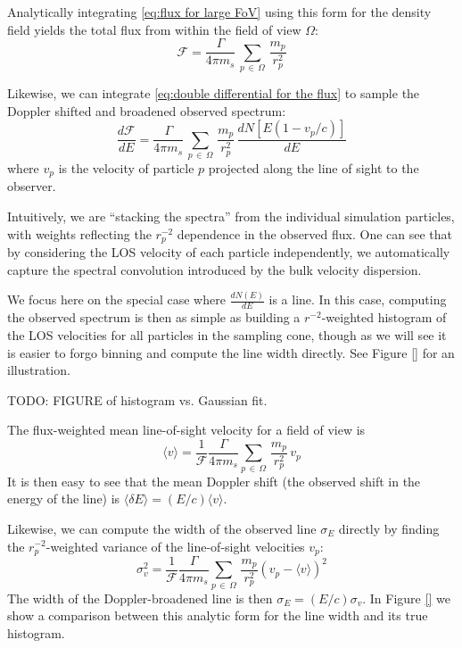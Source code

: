 \documentclass[aps,prl,10pt,twocolumn,superscriptaddress,showpacs]{revtex4-1}
\begin{document}
Analytically integrating \eqref{eq:flux for large FoV} using this form for the density field yields the
total flux from within the field of view $\Omega$:
\begin{equation} 
	\mathcal{F} = \frac{\Gamma}{4\pi m_s}
	\, \sum_{p \, \in \, \Omega} \, \frac{m_p}{r_p^{2}} 
\end{equation}

Likewise, we can integrate \eqref{eq:double differential for the flux} to sample the Doppler shifted
and broadened observed spectrum:
\begin{equation} \label{eq:discrete}
	\frac{d\mathcal{F}}{dE} = \frac{\Gamma}{4 \pi m_s}\, \sum_{p \, \in \, \Omega}
	\, \frac{m_p}{r_p^{2}} \, \frac{dN[E(1-v_p/c)]}{dE}
\end{equation}
where $v_p$ is the velocity of particle $p$ projected along the line of sight to the observer.

Intuitively, we are ``stacking the spectra'' from the individual simulation
particles, with weights reflecting the $r_p^{-2}$ dependence in the observed flux. One can see that by
considering the LOS velocity of each particle independently, we automatically capture the spectral
convolution introduced by the bulk velocity dispersion. 

We focus here on the special case where
$\frac{dN(E)}{dE}$ is a line. In this case, computing the observed spectrum is then as simple as
building a $r^{-2}$-weighted histogram of the LOS velocities for all particles in the sampling cone,
though as we will see it is easier to forgo binning and compute the line width directly. See Figure \ref{} for an
illustration.

TODO: FIGURE of histogram vs. Gaussian fit.

The flux-weighted mean line-of-sight velocity for a field of view is 
\begin{equation} 
	\langle v\rangle =\frac{1}{\mathcal{F}} \frac{\Gamma}{4\pi m_s} \sum_{p \, \in \, \Omega}
	\, \frac{m_p}{r_p^{2}} \, v_p
\end{equation}
It is then easy to see that the mean Doppler shift (the observed shift in the energy of the line) is  
	$\langle \delta E\rangle = (E/c)\langle v \rangle$.

Likewise, we can compute the width of the observed line $\sigma_E$ directly by finding the $r_p^{-2}$-weighted
variance of the line-of-sight velocities $v_p$:
\begin{equation} 
	\sigma_v^2 =\frac{1}{\mathcal{F}} \frac{\Gamma}{4\pi m_s} \sum_{p \, \in \, \Omega}
	\, \frac{m_p}{r_p^{2}} \left(v_p-\langle v\rangle\right)^2 
\end{equation}
The width of the Doppler-broadened line is then $\sigma_E = (E/c) \sigma_v$. In Figure \ref{} we show a comparison 
between this analytic form for the line width and its true histogram.
\end{document}
